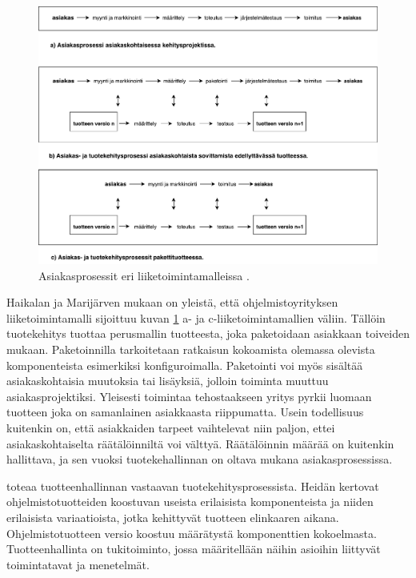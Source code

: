 \documentclass[finnish,12pt,a4paper,pdftex]{article}
\begin{document}
\begin{figure}[!h]
    \centering
    \includegraphics[scale=0.45]{asiakasprosessi.pdf}
    \caption{Asiakasprosessit eri liiketoimintamalleissa \citep{ohjelmistotuotanto}.}
    \label{fig:asiakasprosessi}
\end{figure}

Haikalan ja Marijärven mukaan on yleistä, että ohjelmistoyrityksen liiketoimintamalli sijoittuu kuvan \ref{fig:asiakasprosessi} a- ja c-liiketoimintamallien väliin. Tällöin tuotekehitys tuottaa perusmallin tuotteesta, joka paketoidaan asiakkaan toiveiden mukaan. Paketoinnilla tarkoitetaan ratkaisun kokoamista olemassa olevista komponenteista esimerkiksi konfiguroimalla. Paketointi voi myös sisältää asiakaskohtaisia muutoksia tai lisäyksiä, jolloin toiminta muuttuu asiakasprojektiksi. Yleisesti toimintaa tehostaakseen yritys pyrkii luomaan tuotteen joka on samanlainen asiakkaasta riippumatta. Usein todellisuus kuitenkin on, että asiakkaiden tarpeet vaihtelevat niin paljon, ettei asiakaskohtaiselta räätälöinniltä voi välttyä. Räätälöinnin määrää on kuitenkin hallittava, ja sen vuoksi tuotekehallinnan on oltava mukana asiakasprosessissa.

\cite{okaytannot} toteaa tuotteenhallinnan vastaavan tuotekehitysprosessista. Heidän kertovat ohjelmistotuotteiden koostuvan useista erilaisista komponenteista ja niiden erilaisista variaatioista, jotka kehittyvät tuotteen elinkaaren aikana. Ohjelmistotuotteen versio koostuu määrätystä komponenttien kokoelmasta. Tuotteenhallinta on tukitoiminto, jossa määritellään näihin asioihin liittyvät toimintatavat ja menetelmät. 
\end{document}
